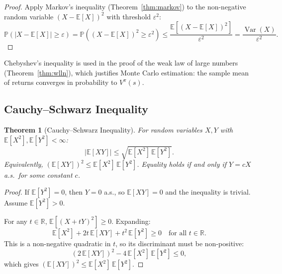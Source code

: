 \documentclass[11pt,a4paper]{article}
\theoremstyle{definition}
\theoremstyle{plain}
\newtheorem{theorem}{Theorem}[section]
\theoremstyle{remark}
\DeclareMathOperator{\Var}{Var}
\newcommand{\E}{\mathbb{E}}
\newcommand{\R}{\mathbb{R}}
\newcommand{\Prob}{\mathbb{P}}
\begin{document}
\begin{proof}
Apply Markov's inequality (Theorem~\ref{thm:markov}) to the non-negative random variable $(X - \E[X])^2$ with threshold $\varepsilon^2$:
\begin{equation}
    \Prob(|X - \E[X]| \geq \varepsilon) = \Prob\!\left((X - \E[X])^2 \geq \varepsilon^2\right) \leq \frac{\E[(X - \E[X])^2]}{\varepsilon^2} = \frac{\Var(X)}{\varepsilon^2}.
\end{equation}
\end{proof}

\begin{rlconnection}[Connection to RL]
Chebyshev's inequality is used in the proof of the weak law of large numbers (Theorem~\ref{thm:wlln}), which justifies Monte Carlo estimation: the sample mean of returns converges in probability to $V^\pi(s)$.
\end{rlconnection}

\subsection{Cauchy--Schwarz Inequality}
\label{subsec:cauchy_schwarz}

\begin{theorem}[Cauchy--Schwarz Inequality]
\label{thm:cauchy_schwarz}
For random variables $X, Y$ with $\E[X^2], \E[Y^2] < \infty$:
\begin{equation}
    |\E[XY]| \leq \sqrt{\E[X^2]\, \E[Y^2]}.
    \label{eq:cauchy_schwarz}
\end{equation}
Equivalently, $(\E[XY])^2 \leq \E[X^2]\, \E[Y^2]$. Equality holds if and only if $Y = cX$ a.s.\ for some constant $c$.
\end{theorem}

\begin{proof}
If $\E[Y^2] = 0$, then $Y = 0$ a.s., so $\E[XY] = 0$ and the inequality is trivial. Assume $\E[Y^2] > 0$.

For any $t \in \R$, $\E[(X + tY)^2] \geq 0$. Expanding:
\begin{equation}
    \E[X^2] + 2t\,\E[XY] + t^2\,\E[Y^2] \geq 0 \quad \text{for all } t \in \R.
    \label{eq:cs_quadratic}
\end{equation}
This is a non-negative quadratic in $t$, so its discriminant must be non-positive:
\begin{equation}
    (2\,\E[XY])^2 - 4\,\E[X^2]\,\E[Y^2] \leq 0,
\end{equation}
which gives $(\E[XY])^2 \leq \E[X^2]\,\E[Y^2]$.
\end{proof}
\end{document}
